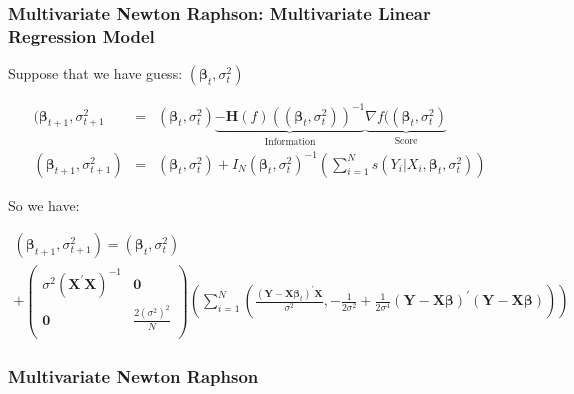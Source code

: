 \documentclass{beamer}
\begin{document}
\begin{frame}
\frametitle{Multivariate Newton Raphson: Multivariate Linear Regression Model}

Suppose that we have guess:
$\left(\boldsymbol{\beta}_{t}, \sigma^{2}_{t}\right)$


\begin{eqnarray}
(\boldsymbol{\beta}_{t+1}, \sigma^{2}_{t+1} & = & \left(\boldsymbol{\beta}_{t}, \sigma^{2}_{t} \right) \underbrace{- \textbf{H}(f)(\left(\boldsymbol{\beta}_{t}, \sigma^{2}_{t} \right))^{-1}}_{\text{Information}} \underbrace{\nabla f(\left(\boldsymbol{\beta}_{t}, \sigma^{2}_{t} \right)}_{\text{Score}}\nonumber \\
\left(\boldsymbol{\beta}_{t+1}, \sigma^{2}_{t+1} \right) & = & \left(\boldsymbol{\beta}_{t}, \sigma^{2}_{t} \right) +  I_{N}(\boldsymbol{\beta}_{t}, \sigma^{2}_{t})^{-1} \left(\sum_{i=1}^{N} s(Y_{i}| X_{i}, \boldsymbol{\beta}_{t}, \sigma^{2}_{t})  \right) \nonumber
\end{eqnarray}

So we have:
\begin{tiny}
\begin{eqnarray}
\left(\boldsymbol{\beta}_{t+1}, \sigma^{2}_{t+1} \right)  =  \left(\boldsymbol{\beta}_{t}, \sigma^{2}_{t} \right)  && \nonumber \\
 + \begin{pmatrix} \sigma^2 \left(\boldsymbol{X}^{'}\boldsymbol{X}\right)^{-1} & \boldsymbol{0} \\
\boldsymbol{0} & \frac{2 (\sigma^2)^2}{N} \\
\end{pmatrix}  \left(\sum_{i=1}^{N} \left( \frac{(\boldsymbol{Y} - \boldsymbol{X}\boldsymbol{\beta}_{t})^{'} \boldsymbol{X} }{\sigma^2}  , -\frac{1}{2 \sigma^2}  +      \frac{1}{2\sigma^4} (\boldsymbol{Y} - \boldsymbol{X}\boldsymbol{\beta} )^{'}(\boldsymbol{Y} - \boldsymbol{X} \boldsymbol{\beta})  \right)    \right)  && \nonumber
\end{eqnarray}
\end{tiny}



\end{frame}




\begin{frame}
\frametitle{Multivariate Newton Raphson}

\pause

\begin{itemize}
 \pause
{} \pause
{} \pause
\end{itemize}

 \pause
{}


\end{frame}
\end{document}

